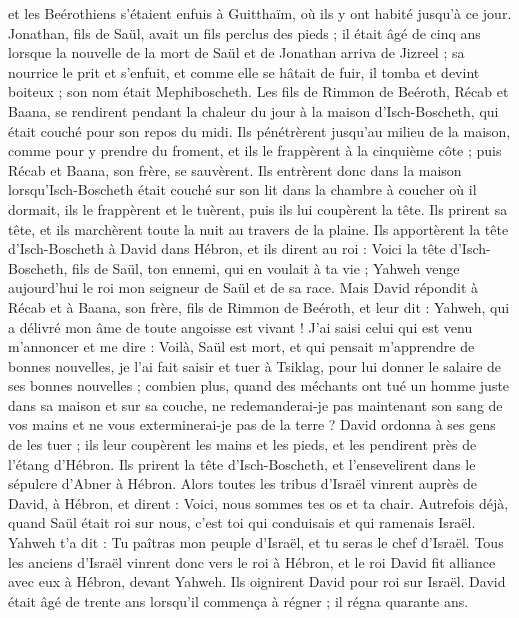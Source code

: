 \begin{multicols}{2}
et les Beérothiens s'étaient enfuis à Guitthaïm, où ils y ont habité jusqu'à ce jour.
Jonathan, fils de Saül, avait un fils perclus des pieds ; il était âgé de cinq ans lorsque la nouvelle de la mort de Saül et de Jonathan arriva de Jizreel ; sa nourrice le prit et s'enfuit, et comme elle se hâtait de fuir, il tomba et devint boiteux ; son nom était Mephiboscheth.
Les fils de Rimmon de Beéroth, Récab et Baana, se rendirent pendant la chaleur du jour à la maison d'Isch-Boscheth, qui était couché pour son repos du midi.
Ils pénétrèrent jusqu'au milieu de la maison, comme pour y prendre du froment, et ils le frappèrent à la cinquième côte ; puis Récab et Baana, son frère, se sauvèrent.
Ils entrèrent donc dans la maison lorsqu’Isch-Boscheth était couché sur son lit dans la chambre à coucher où il dormait, ils le frappèrent et le tuèrent, puis ils lui coupèrent la tête. Ils prirent sa tête, et ils marchèrent toute la nuit au travers de la plaine.
Ils apportèrent la tête d'Isch-Boscheth à David dans Hébron, et ils dirent au roi : Voici la tête d'Isch-Boscheth, fils de Saül, ton ennemi, qui en voulait à ta vie ; Yahweh venge aujourd'hui le roi mon seigneur de Saül et de sa race.
Mais David répondit à Récab et à Baana, son frère, fils de Rimmon de Beéroth, et leur dit : Yahweh, qui a délivré mon âme de toute angoisse est vivant !
J’ai saisi celui qui est venu m’annoncer et me dire : Voilà, Saül est mort, et qui pensait m'apprendre de bonnes nouvelles, je l’ai fait saisir et tuer à Tsiklag, pour lui donner le salaire de ses bonnes nouvelles ;
combien plus, quand des méchants ont tué un homme juste dans sa maison et sur sa couche, ne redemanderai-je pas maintenant son sang de vos mains et ne vous exterminerai-je pas de la terre ?
David ordonna à ses gens de les tuer ; ils leur coupèrent les mains et les pieds, et les pendirent près de l'étang d'Hébron. Ils prirent la tête d'Isch-Boscheth, et l'ensevelirent dans le sépulcre d'Abner à Hébron.
\VerseOne{}Alors toutes les tribus d'Israël vinrent auprès de David, à Hébron, et dirent : Voici, nous sommes tes os et ta chair.
Autrefois déjà, quand Saül était roi sur nous, c’est toi qui conduisais et qui ramenais Israël. Yahweh t'a dit : Tu paîtras mon peuple d'Israël, et tu seras le chef d'Israël.
Tous les anciens d'Israël vinrent donc vers le roi à Hébron, et le roi David fit alliance avec eux à Hébron, devant Yahweh. Ils oignirent David pour roi sur Israël.
David était âgé de trente ans lorsqu’il commença à régner ; il régna quarante ans.

\end{multicols}
